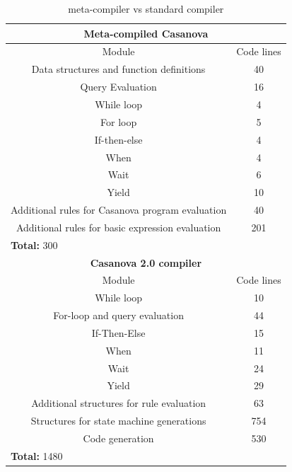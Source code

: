 \begin{table}
	\centering
	\begin{tabular}{|c|c|}
		\hline
		\multicolumn{2}{|c|}{\textbf{Meta-compiled Casanova}} \\
		\hline
		Module & Code lines \\
		\hline
		Data structures and function definitions & 40 \\
		\hline
		Query Evaluation & 16 \\
		\hline
		While loop & 4 \\
		\hline
		For loop & 5 \\
		\hline
		If-then-else & 4 \\
		\hline
		When & 4 \\
		\hline
		Wait & 6 \\
		\hline
		Yield & 10 \\
		\hline
		Additional rules for Casanova program evaluation & 40 \\
		\hline
		Additional rules for basic expression evaluation & 201 \\
		\hline
		\multicolumn{2}{|l|}{\textbf{Total: } 300} \\
		\hline
		\multicolumn{2}{|c|}{\textbf{Casanova 2.0 compiler}} \\
		\hline
		Module & Code lines \\
		\hline
		While loop & 10 \\
		\hline
		For-loop and query evaluation & 44 \\
		\hline
		If-Then-Else & 15 \\
		\hline
		When & 11 \\
		\hline
		Wait & 24 \\
		\hline
		Yield & 29 \\
		\hline
		Additional structures for rule evaluation & 63 \\
		\hline
		Structures for state machine generations & 754 \\
		\hline
		Code generation & 530 \\
		\hline
		\multicolumn{2}{|l|}{\textbf{Total: } 1480} \\
		\hline			
	\end{tabular}	
	\caption{meta-compiler vs standard compiler}
	\label{tab:ch_mcnv_languages_casanova_compiler_comparison}
\end{table}

